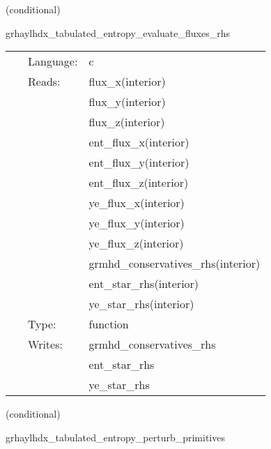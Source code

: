 \documentclass{article}
\begin{document}
\vspace{5mm}

   (conditional) 

\hspace{5mm} grhaylhdx\_tabulated\_entropy\_evaluate\_fluxes\_rhs 

\hspace{5mm}{\it entropy+tabulated version of grhaylhdx\_evaluate\_fluxes\_rhs } 


\hspace{5mm}

 \begin{tabular*}{160mm}{cll} 
~ & Language:  & c \\ 
~ & Reads:  & flux\_x(interior) \\ 
~& ~ &flux\_y(interior)\\ 
~& ~ &flux\_z(interior)\\ 
~& ~ &ent\_flux\_x(interior)\\ 
~& ~ &ent\_flux\_y(interior)\\ 
~& ~ &ent\_flux\_z(interior)\\ 
~& ~ &ye\_flux\_x(interior)\\ 
~& ~ &ye\_flux\_y(interior)\\ 
~& ~ &ye\_flux\_z(interior)\\ 
~& ~ &grmhd\_conservatives\_rhs(interior)\\ 
~& ~ &ent\_star\_rhs(interior)\\ 
~& ~ &ye\_star\_rhs(interior)\\ 
~ & Type:  & function \\ 
~ & Writes:  & grmhd\_conservatives\_rhs \\ 
~& ~ &ent\_star\_rhs\\ 
~& ~ &ye\_star\_rhs\\ 
\end{tabular*} 


\vspace{5mm}

   (conditional) 

\hspace{5mm} grhaylhdx\_tabulated\_entropy\_perturb\_primitives 

\hspace{5mm}{\it entropy+tabulated version of grhaylhdx\_perturb\_primitives } 


\hspace{5mm}
\end{document}
